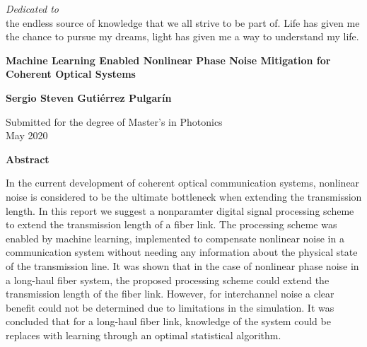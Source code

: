 \newpage
{}

\thispagestyle{empty}
\begin{center}
 \vspace*{2cm}
  \textit{\LARGE {Dedicated to}}\\ 
the endless source of knowledge that we all strive to be part of. Life has given me the chance to pursue my dreams, light has given me a way to understand my life. 



\end{center}


\newpage
\thispagestyle{empty}
\begin{center}
  \textbf{\large Machine Learning Enabled Nonlinear Phase Noise Mitigation for Coherent Optical Systems}

  \vspace*{1cm}
  \textbf{\normalsize Sergio Steven Guti\'errez Pulgar\'in}

  \vspace*{0.5cm}
  {\normalsize Submitted for the degree of Master's in Photonics\\ May 2020}

  \vspace*{1cm}
  \textbf{\large Abstract}
\end{center}

\noindent In the current development of coherent optical communication systems, nonlinear noise is considered to be the ultimate bottleneck when extending the transmission length. In this report we suggest a nonparamter digital signal processing scheme to extend the transmission length of a fiber link. The processing scheme was enabled by machine learning,  implemented to compensate nonlinear noise in a communication system without needing any information about the physical state of the transmission line. It was shown that in the case of nonlinear phase noise in a long-haul fiber system, the proposed processing scheme could extend the transmission length of the fiber link. However, for interchannel noise a clear benefit could not be determined due to limitations in the simulation. It was concluded that for a long-haul fiber link, knowledge of the system could be replaces with learning through an optimal statistical algorithm. 


